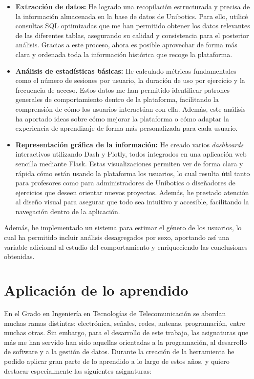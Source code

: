 \documentclass[a4paper, 12pt]{book}
\begin{document}
\begin{itemize}
    \item \textbf{Extracción de datos:} He logrado una recopilación estructurada y precisa de la información almacenada en la base de datos de Unibotics. Para ello, utilicé consultas SQL optimizadas que me han permitido obtener los datos relevantes de las diferentes tablas, asegurando su calidad y consistencia para el posterior análisis. Gracias a este proceso, ahora es posible aprovechar de forma más clara y ordenada toda la información histórica que recoge la plataforma.

    \item \textbf{Análisis de estadísticas básicas:} He calculado métricas fundamentales como el número de sesiones por usuario, la duración de uso por ejercicio y la frecuencia de acceso. Estos datos me han permitido identificar patrones generales de comportamiento dentro de la plataforma, facilitando la comprensión de cómo los usuarios interactúan con ella. Además, este análisis ha aportado ideas sobre cómo mejorar la plataforma o cómo adaptar la experiencia de aprendizaje de forma más personalizada para cada usuario.

    \item \textbf{Representación gráfica de la información:} He creado varios \textit{dashboards} interactivos utilizando Dash y Plotly, todos integrados en una aplicación web sencilla mediante Flask. Estas visualizaciones permiten ver de forma clara y rápida cómo están usando la plataforma los usuarios, lo cual resulta útil tanto para profesores como para administradores de Unibotics o diseñadores de ejercicios que deseen orientar nuevos proyectos. Además, he prestado atención al diseño visual para asegurar que todo sea intuitivo y accesible, facilitando la navegación dentro de la aplicación.
\end{itemize}

Además, he implementado un sistema para estimar el género de los usuarios, lo cual ha permitido incluir análisis desagregados por sexo, aportando así una variable adicional al estudio del comportamiento y enriqueciendo las conclusiones obtenidas.
\section{Aplicación de lo aprendido}
\label{sec:aplicacion}

En el Grado en Ingeniería en Tecnologías de Telecomunicación se abordan muchas ramas distintas: electrónica, señales, redes, antenas, programación, entre muchas otras. Sin embargo, para el desarrollo de este trabajo, las asignaturas que más me han servido han sido aquellas orientadas a la programación, al desarrollo de software y a la gestión de datos. Durante la creación de la herramienta he podido aplicar gran parte de lo aprendido a lo largo de estos años, y quiero destacar especialmente las siguientes asignaturas:
\end{document}
